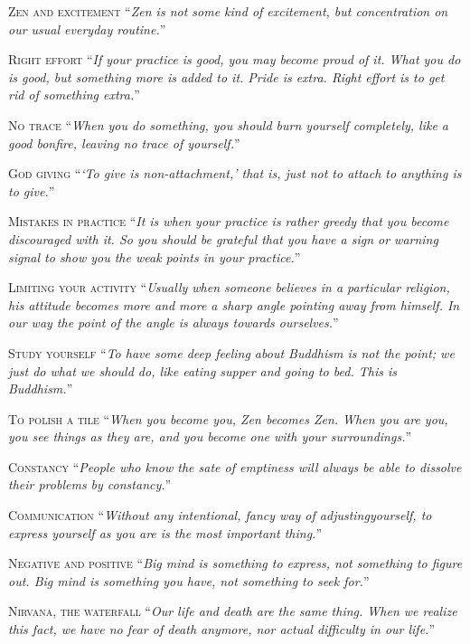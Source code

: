 \documentclass[14pt]{extarticle}
\newcommand{\aphor}[2]{
    \lettrine[lines=2, lraise=0.15]{#1}{#2}
}
\begin{document}
\aphor{Z}{en and excitement} \enquote{\textit{Zen is not some kind of excitement, but concentration on our usual everyday routine.}}

\aphor{R}{ight effort} \enquote{\textit{If your practice is good, you may become proud of it. What you do is good, but something more is added to it. Pride is extra. Right effort is to get rid of something extra.}}

\aphor{N}{o trace} \enquote{\textit{When you do something, you should burn yourself completely, like a good bonfire, leaving no trace of yourself.}}

\aphor{G}{od giving} \enquote{\textit{\enquote{To give is non-attachment,} that is, just not to attach to anything is to give.}}

\aphor{M}{istakes in practice} \enquote{\textit{It is when your practice is rather greedy that you become discouraged with it. So you should be grateful that you have a sign or warning signal to show you the weak points in your practice.}}

\aphor{L}{imiting your activity} \enquote{\textit{Usually when someone believes in a particular religion, his attitude becomes more and more a sharp angle pointing away from himself. In our way the point of the angle is always towards ourselves.}}

\pagebreak

\aphor{S}{tudy yourself} \enquote{\textit{To have some deep feeling about Buddhism is not the point; we just do what we should do, like eating supper and going to bed. This is Buddhism.}}


\aphor{T}{o polish a tile} \enquote{\textit{When you become you, Zen becomes Zen. When you are you, you see things as they are, and you become one with your surroundings.}}

\aphor{C}{onstancy} \enquote{\textit{People who know the sate of emptiness will always be able to dissolve their problems by constancy.}}

\aphor{C}{ommunication} \enquote{\textit{Without any intentional, fancy way of adjustingyourself, to express yourself as you are is the most important thing.}}

\aphor{N}{egative and positive} \enquote{\textit{Big mind is something to express, not something to figure out. Big mind is something you have, not something to seek for.}}

\aphor{N}{irvana, the waterfall} \enquote{\textit{Our life and death are the same thing. When we realize this fact, we have no fear of death anymore, nor actual difficulty in our life.}}
\end{document}
